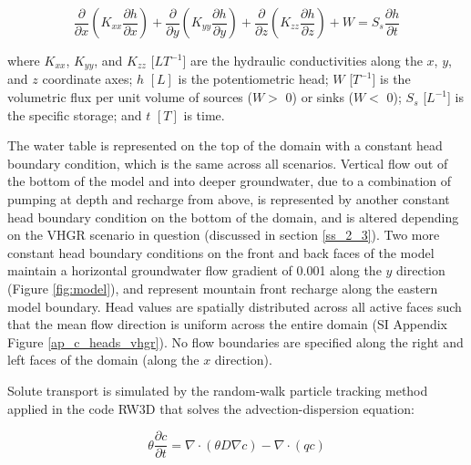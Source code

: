 \begin{equation}
    \frac{\partial{}}{\partial{x}}(K_{xx} \frac{\partial{h}}{\partial{x}}) +
    \frac{\partial{}}{\partial{y}}(K_{yy} \frac{\partial{h}}{\partial{y}}) +
    \frac{\partial{}}{\partial{z}}(K_{zz} \frac{\partial{h}}{\partial{z}}) +
    W = S_s \frac{\partial{h}}{\partial{t}}
\label{eq:gwflow}
\end{equation}

where $K_{xx}$, $K_{yy}$, and $K_{zz}$ [$LT^{-1}$] are the hydraulic conductivities along the $x$, $y$, and $z$ coordinate axes; $h$ $[L]$ is the potentiometric head; $W$ [$T^{-1}$] is the volumetric flux per unit volume of sources ($W >$ 0) or sinks ($W <$ 0); $S_s$ [$L^{-1}$] is the specific storage; and $t$ $[T]$ is time. 

The water table is represented on the top of the domain with a constant head boundary condition, which is the same across all scenarios. Vertical flow out of the bottom of the model and into deeper groundwater, due to a combination of pumping at depth and recharge from above, is represented by another constant head boundary condition on the bottom of the domain, and is altered depending on the VHGR scenario in question (discussed in section \ref{ss_2_3}). Two more constant head boundary conditions on the front and back faces of the model maintain a horizontal groundwater flow gradient of 0.001 along the $y$ direction (Figure \ref{fig:model}), and represent mountain front recharge along the eastern model boundary. Head values are spatially distributed across all active faces such that the mean flow direction is uniform across the entire domain (SI Appendix Figure \ref{ap_c_heads_vhgr}). No flow boundaries are specified along the right and left faces of the domain (along the $x$ direction). 



Solute transport is simulated by the random‐walk particle tracking method \citep{labolle1998diffusion, labolle2000diffusion} applied in the code RW3D \citep{fernandez2005differences, henri2014toward, henri2015random, salamon2006modeling} that solves the advection-dispersion equation: 

\begin{equation}
    \theta \frac{\partial{c}}{\partial{t}} = \nabla \cdot (\theta D \nabla c) - \nabla \cdot (qc)
\label{eq:ade}
\end{equation}


